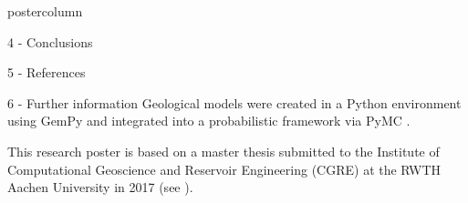 \documentclass{beamer}
\begin{document}
\begin{frame}
\begin{columns}
\begin{column}{.249\textwidth}
\begin{beamercolorbox}[center]{postercolumn}
\begin{minipage}{.98\textwidth}
{\begin{myblock}{4 - Conclusions}
	


\end{myblock}			
								
					
\begin{myblock}{5 - References}
	\footnotesize
	
\end{myblock}

\begin{myblock}{6 - Further information}
\small
Geological models were created in a Python environment using GemPy \citep{gmd-2018-61} and integrated into a probabilistic framework via PyMC \citep{salvatier2016pymc3}. 

This research poster is based on a master thesis submitted to the Institute of Computational Geoscience and Reservoir Engineering (CGRE) at the RWTH Aachen University in 2017 (see \citet{stamm2017}).
		

			
		

\end{myblock}}
\end{minipage}
\end{beamercolorbox}
\end{column}
\end{columns}
\end{frame}
\end{document}

